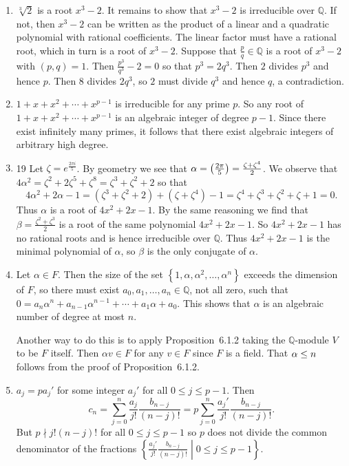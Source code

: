 \documentclass[12pt]{article}
\let\deg\relax\DeclareMathOperator{\deg}{\mathsf{deg}}
\let\cos\relax\DeclareMathOperator{\cos}{\mathsf{cos}}
\begin{document}
\begin{enumerate}
\item %
$\sqrt[3]{2}$ is a root $x^3-2$. It remains to
show that $x^3-2$ is irreducible over $\mathbb{Q}$.
If not, then $x^3-2$ can be written as the product
of a linear and a quadratic polynomial with rational coefficients.
The linear factor must have a rational root, which in turn
is a root of $x^3-2$.
Suppose that $\frac{p}{q}\in\mathbb{Q}$
is a root of $x^3-2$ with $\left(p,q\right)=1$.
Then $\frac{p^3}{q^3}-2=0$ so that $p^3=2q^3$. Then $2$
divides $p^3$ and hence $p$. Then $8$ divides $2q^3$,
so $2$ must divide $q^3$ and hence $q$, a contradiction.

\item %
$1+x+x^2+\cdots+x^{p-1}$ is irreducible for any prime $p$.
So any root of $1+x+x^2+\cdots+x^{p-1}$ is an algebraic
integer of degree $p-1$.
Since there exist infinitely many primes,
it follows that there exist algebraic integers of arbitrary
high degree.

\item 19
Let $\zeta=e^{\frac{2\pi i}{5}}$.
By geometry we see that $\alpha=\cos\left(\frac{2\pi}{5}\right)
=\frac{\zeta+\zeta^4}{2}$.
We observe that $4\alpha^2=\zeta^2+2\zeta^5+\zeta^8
=\zeta^3+\zeta^2+2$ so that
\[4\alpha^2+2\alpha-1=\left(\zeta^3+\zeta^2+2\right)+
\left(\zeta+\zeta^4\right)-1
=\zeta^4+\zeta^3+\zeta^2+\zeta+1=0.\]
Thus $\alpha$ is a root of $4x^2+2x-1$.
By the same reasoning we find that $\beta=\frac{\zeta^2+\zeta^3}{2}$
is a root of the same polynomial
$4x^2+2x-1$.
So $4x^2+2x-1$ has no rational roots and
is hence irreducible over $\mathbb{Q}$. Thus $4x^2+2x-1$
is the minimal polynomial of $\alpha$, so $\beta$ is the
only conjugate of $\alpha$.

\item %
Let $\alpha\in F$. Then the size of the set
$\left\{1,\alpha,\alpha^2,\ldots,\alpha^n\right\}$
exceeds the dimension of $F$, so there must exist
$a_0,a_1,\ldots,a_n\in\mathbb{Q}$, not all zero,
such that $0=a_n\alpha^n+a_{n-1}\alpha^{n-1}+\cdots+a_1\alpha+a_0$.
This shows that $\alpha$ is an algebraic number of degree
at most $n$.

Another way to do this is to apply Proposition~6.1.2
taking the $\mathbb{Q}$-module $V$ to be $F$ itself.
Then $\alpha v\in F$ for any $v\in F$ since $F$ is a field.
That $\deg\alpha\le n$ follows from the proof of Proposition~6.1.2.

\item %
$a_j=pa_j'$ for some integer $a_j'$ for all $0\le j\le p-1$.
Then \[c_n=\sum_{j=0}^n\frac{a_j}{j!}\frac{b_{n-j}}{\left(n-j\right)!}
=p\sum_{j=0}^n\frac{a_j'}{j!}\frac{b_{n-j}}{\left(n-j\right)!}.\]
But $p\nmid j!\left(n-j\right)!$ for all $0\le j\le p-1$
so $p$ does not divide the common denominator of the fractions
$\left\{\frac{a_j'}{j!}\frac{b_{n-j}}{\left(n-j\right)!}
\middle\vert 0\le j\le p-1\right\}$.


\end{enumerate}
\end{document}
